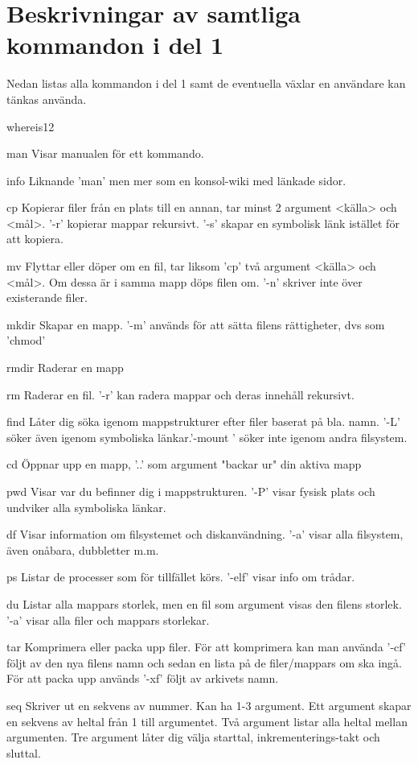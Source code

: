 \documentclass[11pt]{article}
\begin{document}
\section{Beskrivningar av samtliga kommandon i del 1}
Nedan listas alla kommandon i del 1 samt de eventuella växlar en användare kan tänkas använda.
\begin{labeling}{whereis12}
\item [man] Visar manualen för ett kommando.
\item [info] Liknande 'man' men mer som en konsol-wiki med länkade sidor.
\item [cp] Kopierar filer från en plats till en annan, tar minst 2 argument <källa> och <mål>. '-r' kopierar mappar rekursivt. '-s' skapar en symbolisk länk istället för att kopiera.
\item [mv] Flyttar eller döper om en fil, tar liksom 'cp' två argument <källa> och <mål>. Om dessa är i samma mapp döps filen om. '-n' skriver inte över existerande filer.
\item [mkdir] Skapar en mapp. '-m' används för att sätta filens rättigheter, dvs som 'chmod'
\item [rmdir] Raderar en mapp
\item [rm] Raderar en fil. '-r' kan radera mappar och deras innehåll rekursivt.
\item [find] Låter dig söka igenom mappstrukturer efter filer baserat på bla. namn.	'-L' söker även igenom symboliska länkar.'-mount ' söker inte igenom andra filsystem.
\item [cd] Öppnar upp en mapp, '..' som argument "backar ur" din aktiva mapp
\item [pwd]  Visar var du befinner dig i mappstrukturen. '-P' visar fysisk plats och undviker alla symboliska länkar.
\item [df] Visar information om filsystemet och diskanvändning. '-a' visar alla filsystem, även onåbara, dubbletter m.m.
\item [ps] Listar de processer som för tillfället körs. '-elf' visar info om trådar.
\item [du] Listar alla mappars storlek, men en fil som argument visas den filens storlek. '-a' visar alla filer och mappars storlekar.
\item [tar] Komprimera eller packa upp filer. För att komprimera kan man använda '-cf' följt av den nya filens namn och sedan en lista på de filer/mappars om ska ingå. För att packa upp används  '-xf' följt av arkivets namn.
\item [seq] Skriver ut en sekvens av nummer. Kan ha 1-3 argument. Ett argument skapar en sekvens av heltal från 1 till argumentet. Två argument listar alla heltal mellan argumenten. Tre argument låter dig välja starttal, inkrementerings-takt och sluttal.

\end{labeling}
\end{document}
